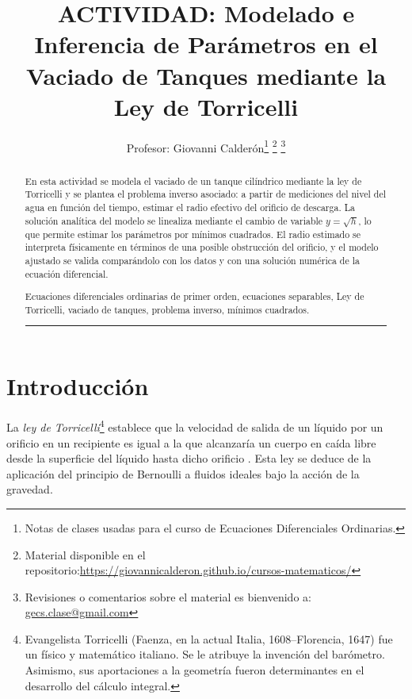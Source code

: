 \documentclass[oneside,letter,spanish,activeacute,english,links,10pt]{amcaGCS_EDO}
\title{ACTIVIDAD: Modelado e Inferencia de Parámetros en el Vaciado de Tanques mediante la Ley de Torricelli}
\author[a]{Profesor: Giovanni Calderón\thanks{Notas de clases usadas para el curso de Ecuaciones Diferenciales Ordinarias.} 
	\thanks{Material disponible en el repositorio:\url{https://giovannicalderon.github.io/cursos-matematicos/}}
	\thanks{Revisiones o comentarios sobre el material es bienvenido a: \url{gecs.clase@gmail.com}}}
\begin{document}
\maketitle
\noindent\hrulefill
\renewcommand{\abstractname}{Resumen}

\begin{abstract}
En esta actividad se modela el vaciado de un tanque cilíndrico mediante la ley de Torricelli y se plantea el problema inverso asociado: a partir de mediciones del nivel del agua en función del tiempo, estimar el radio efectivo del orificio de descarga. La solución analítica del modelo se linealiza mediante el cambio de variable $y=\sqrt{h}$, lo que permite estimar los parámetros por mínimos cuadrados. El radio estimado se interpreta físicamente en términos de una posible obstrucción del orificio, y el modelo ajustado se valida comparándolo con los datos y con una solución numérica de la ecuación diferencial.
	
	
	\bigskip{}
	Ecuaciones diferenciales ordinarias de primer orden, ecuaciones separables, Ley de Torricelli, vaciado de tanques, problema inverso, mínimos cuadrados.
	\\\noindent\rule[2mm]{16cm}{1pt}
	
	
\end{abstract}

\vspace{.6cm}




\section{Introducción}
La {\it ley de Torricelli}\footnote{Evangelista Torricelli (Faenza, en la actual Italia, 1608--Florencia, 1647) fue un físico y matemático italiano. Se le atribuye la invención del barómetro. Asimismo, sus aportaciones a la geometría fueron determinantes en el desarrollo del cálculo integral.} establece que la velocidad de salida de un líquido por un orificio en un recipiente es igual a la que alcanzaría un cuerpo en caída libre desde la superficie del líquido hasta dicho orificio \cite{Boyce, Zill1, Zill2, FoxMcDonald2015}. Esta ley se deduce de la aplicación del principio de Bernoulli a fluidos ideales bajo la acción de la gravedad.
\end{document}
